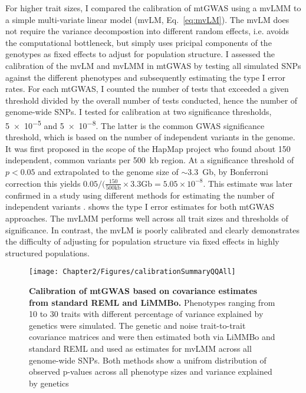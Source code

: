 For higher trait sizes, I compared the calibration of mtGWAS using a mvLMM to a simple multi-variate linear model (mvLM, Eq.~\ref{eq:mvLM}). The mvLM does not require the variance decompostion into different random effects, i.e. avoids the computational bottleneck, but simply uses pricipal components of the genotypes as fixed effects to adjust for population structure. I assessed the calibration of the mvLM and mvLMM in mtGWAS by testing all simulated SNPs against the different phenotypes and subsequently estimating the type I error rates. For each mtGWAS, I counted the number of tests that exceeded a given threshold divided by the overall number of tests conducted, hence the number of genome-wide SNPs. I tested for calibration at two significance thresholds, \num{5e-5} and \num{5e-8}.  The latter is the common GWAS significance threshold, which is based on the number of independent variants in the genome. It was first proposed in the scope of the HapMap project \citeyear{HapMap2005} who found about \num{150} independent, common variants per \num{500}~kb region. At a significance threshold of \(p < 0.05\) and extrapolated to the genome size of \(\sim 3.3\)~Gb, by Bonferroni correction this yields  \(0.05/(\frac{150}{500\text{kb}} \times 3.3 \text{Gb}= 5.05 \times 10^{-8}\). This estimate was later confirmed in a study using different methods for estimating the number of independent variants \citep{Fadista2016}.  shows the type I error estimates for both mtGWAS approaches. The mvLMM performs well across all trait sizes and thresholds of significance. In contrast, the mvLM is poorly calibrated and clearly demonstrates the difficulty of adjusting for population structure via fixed effects in highly structured populations.  
 
\begin{figure}[hbtp]
	\centering	
	\texttt{[image: Chapter2/Figures/calibrationSummaryQQAll]}\\
	\caption[\textbf{Calibration of mtGWAS based on covariance estimates from standard REML and LiMMBo.}]{\textbf{Calibration of mtGWAS based on covariance estimates from standard REML and LiMMBo.} Phenotypes  ranging from \num{10} to \num{30} traits with different percentage of variance explained by genetics were simulated. The genetic and noise trait-to-trait covariance matrices  and  were then estimated both via LiMMBo and standard REML and used as estimates for mvLMM across all genome-wide SNPs. Both methods show a unifrom distribution of observed p-values across all phenotype sizes and variance explained by genetics }
	  \label{fig:calibration}%
\end{figure}


